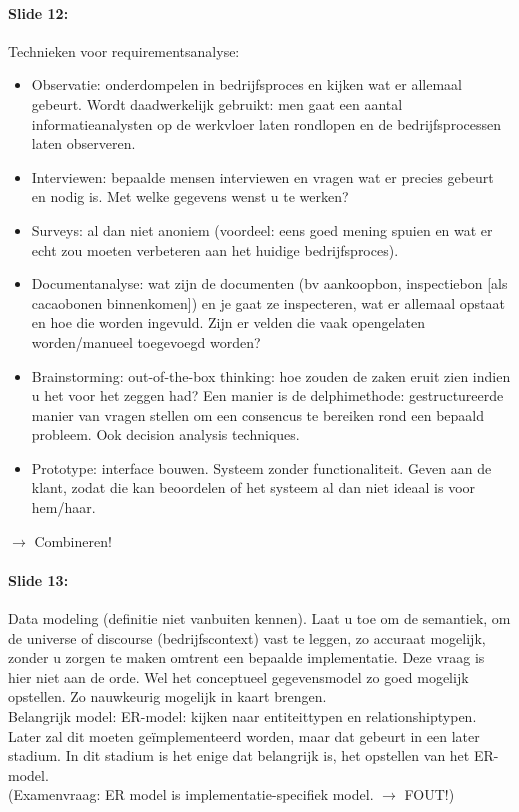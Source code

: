 \documentclass[10pt,a4paper]{report}
\begin{document}
\paragraph{Slide 12:}Technieken voor requirementsanalyse:
\begin{itemize}
\item Observatie: onderdompelen in bedrijfsproces en kijken wat er allemaal gebeurt. Wordt daadwerkelijk gebruikt: men gaat een aantal informatieanalysten op de werkvloer laten rondlopen en de bedrijfsprocessen laten observeren.
\item Interviewen: bepaalde mensen interviewen en vragen wat er precies gebeurt en nodig is. Met welke gegevens wenst u te werken?
\item Surveys: al dan niet anoniem (voordeel: eens goed mening spuien en wat er echt zou moeten verbeteren aan het huidige bedrijfsproces).
\item Documentanalyse: wat zijn de documenten (bv aankoopbon, inspectiebon [als cacaobonen binnenkomen]) en je gaat ze inspecteren, wat er allemaal opstaat en hoe die worden ingevuld. Zijn er velden die vaak opengelaten worden/manueel toegevoegd worden?
\item Brainstorming: out-of-the-box thinking: hoe zouden de zaken eruit zien indien u het voor het zeggen had? Een manier is de delphimethode: gestructureerde manier van vragen stellen om een consencus te bereiken rond een bepaald probleem. Ook decision analysis techniques.
\item Prototype: interface bouwen. Systeem zonder functionaliteit. Geven aan de klant, zodat die kan beoordelen of het systeem al dan niet ideaal is voor hem/haar.
\end{itemize}
$\rightarrow$ Combineren!

\paragraph{Slide 13:}Data modeling (definitie niet vanbuiten kennen). Laat u toe om de semantiek, om de universe of discourse (bedrijfscontext) vast te leggen, zo accuraat mogelijk, zonder u zorgen te maken omtrent een bepaalde implementatie. Deze vraag is hier niet aan de orde. Wel het conceptueel gegevensmodel zo goed mogelijk opstellen. Zo nauwkeurig mogelijk in kaart brengen.\\
Belangrijk model: ER-model: kijken naar entiteittypen en relationshiptypen. Later zal dit moeten geïmplementeerd worden, maar dat gebeurt in een later stadium. In dit stadium is het enige dat belangrijk is, het opstellen van het ER-model.\\
(Examenvraag: ER model is implementatie-specifiek model. $\rightarrow$ FOUT!)
\end{document}
